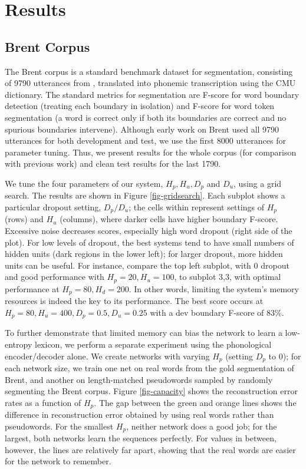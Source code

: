 \documentclass[11pt,letterpaper]{article}
\begin{document}
\section{Results}

\subsection{Brent Corpus}

The Brent corpus \cite{Brent99} is a standard benchmark dataset for
segmentation, consisting of 9790 utterances from
, translated into phonemic transcription using
the CMU dictionary. The standard metrics for segmentation are F-score
for word boundary detection (treating each boundary in isolation) and
F-score for word token segmentation (a word is correct only if both
its boundaries are correct and no spurious boundaries
intervene). Although early work on Brent used all 9790 utterances for
both development and test, we use the first 8000 utterances for
parameter tuning. Thus, we present results for the whole corpus (for
comparison with previous work) and clean test results for the last
1790.


We tune the four parameters of our system, $H_p, H_u, D_p$ and $D_u$,
using a grid search. The results are shown in Figure
\ref{fig-gridsearch}. Each subplot shows a particular dropout setting,
$D_p/D_u$; the cells within represent settings of $H_p$ (rows) and
$H_u$ (columns), where darker cells have higher boundary
F-score. Excessive noise decreases scores, especially high word
dropout (right side of the plot). For low levels of dropout, the best
systems tend to have small numbers of hidden units (dark regions in
the lower left); for larger dropout, more hidden units can be
useful. For instance, compare the top left subplot, with 0 dropout and
good performance with $H_p=20, H_u=100$, to subplot 3,3, with optimal
performance at $H_p=80, H_d=200$. In other words, limiting the
system's memory resources is indeed the key to its performance. The
best score occurs at $H_p=80, H_u=400, D_p=0.5, D_u=0.25$ with a dev
boundary F-score of 83\%.

To further demonstrate that limited memory can bias the network to
learn a low-entropy lexicon, we perform a separate experiment using
the phonological encoder/decoder alone. We create networks with
varying $H_p$ (setting $D_p$ to 0); for each network size, we train
one net on real words from the gold segmentation of Brent, and another
on length-matched pseudowords sampled by randomly segmenting the Brent
corpus. Figure \ref{fig-capacity} shows the reconstruction error rates
as a function of $H_p$. The gap between the green and orange lines
shows the difference in reconstruction error obtained by using real
words rather than pseudowords. For the smallest $H_p$, neither network
does a good job; for the largest, both networks learn the sequences
perfectly. For values in between, however, the lines are relatively
far apart, showing that the real words are easier for the network to
remember.
\end{document}
